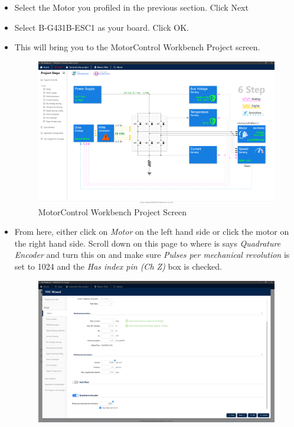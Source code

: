 \documentclass[10pt]{article}
\begin{document}
\begin{itemize}
\begin{figure}[H]
                    \end{figure}
                \item Select the Motor you profiled in the previous section. Click Next
                \item Select B-G431B-ESC1 as your board. Click OK.
                \item This will bring you to the MotorControl Workbench Project screen.
                    \begin{figure}[H]
                        \centerline{\includegraphics[width=\textwidth]{References/MCW Project Screen.png}}
                        \caption{MotorControl Workbench Project Screen}
                    \end{figure}
                \item From here, either click on \emph{Motor} on the left hand side or click the motor on the right hand side. Scroll down on this page to where is says \emph{Quadrature Encoder} and turn this on and make sure \emph{Pulses per mechanical revolution} is set to 1024 and the \emph{Has index pin (Ch Z)} box is checked.
                    \begin{figure}[H]
                        \centerline{\includegraphics[width=\textwidth]{References/MCW FOC Quadrature Encoder.png}}

\end{figure}
\end{itemize}
\end{document}
